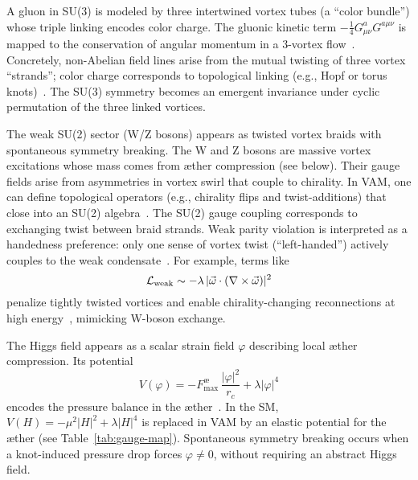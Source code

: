 \documentclass[a4paper,12pt]{article}
\begin{document}
A gluon in SU(3) is modeled by three intertwined vortex tubes (a ``color bundle'') whose triple linking encodes color charge. The gluonic kinetic term $-\tfrac{1}{4}G^a_{\mu\nu}G^{a\mu\nu}$ is mapped to the conservation of angular momentum in a 3-vortex flow~\cite{vam-lagrangian,vam-helicity}. Concretely, non-Abelian field lines arise from the mutual twisting of three vortex ``strands''; color charge corresponds to topological linking (e.g., Hopf or torus knots)~\cite{vam-helicity}. The SU(3) symmetry becomes an emergent invariance under cyclic permutation of the three linked vortices.

The weak SU(2) sector (W/Z bosons) appears as twisted vortex braids with spontaneous symmetry breaking. The W and Z bosons are massive vortex excitations whose mass comes from æther compression (see below). Their gauge fields arise from asymmetries in vortex swirl that couple to chirality. In VAM, one can define topological operators (e.g., chirality flips and twist-additions) that close into an SU(2) algebra~\cite{vam-lagrangian}. The SU(2) gauge coupling corresponds to exchanging twist between braid strands. Weak parity violation is interpreted as a handedness preference: only one sense of vortex twist (``left-handed'') actively couples to the weak condensate~\cite{vam-weak}. For example, terms like
\begin{equation}
    \mathcal{L}_{\rm weak} \sim -\lambda\,|\vec{\omega}\cdot(\nabla\times\vec{\omega})|^2
\end{equation}
penalize tightly twisted vortices and enable chirality-changing reconnections at high energy~\cite{vam-weak}, mimicking W-boson exchange.

The Higgs field appears as a scalar strain field $\varphi$ describing local æther compression. Its potential
\begin{equation}
    V(\varphi) = -F_{\text{max}}^{æ}\,\frac{|\varphi|^2}{r_c} + \lambda|\varphi|^4
\end{equation}
encodes the pressure balance in the æther~\cite{vam-lagrangian}. In the SM, $V(H)=-\mu^2|H|^2+\lambda|H|^4$ is replaced in VAM by an elastic potential for the æther (see Table~\ref{tab:gauge-map}). Spontaneous symmetry breaking occurs when a knot-induced pressure drop forces $\varphi\neq0$, without requiring an abstract Higgs field.
\end{document}

